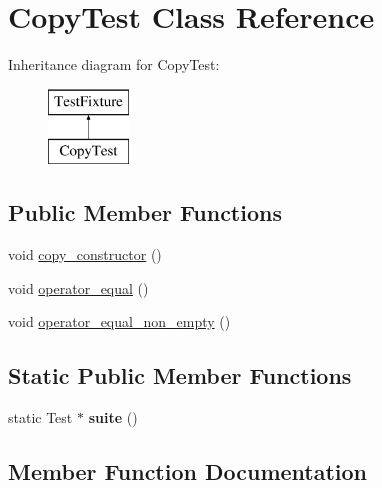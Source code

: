 \hypertarget{class_copy_test}{}\section{Copy\+Test Class Reference}
\label{class_copy_test}
Inheritance diagram for Copy\+Test\+:\begin{figure}[H]
\begin{center}
\leavevmode
\includegraphics[height=2.000000cm]{class_copy_test}
\end{center}
\end{figure}
\subsection*{Public Member Functions}
\begin{DoxyCompactItemize}
\item 
void \hyperlink{class_copy_test_a753620e968ee6ac627e4e65ad139a54f}{copy\+\_\+constructor} ()
\item 
void \hyperlink{class_copy_test_aea0770d1ee3defbee564d72a7d3d9a44}{operator\+\_\+equal} ()
\item 
void \hyperlink{class_copy_test_a37811781b4c94cc5414b236290aae0d0}{operator\+\_\+equal\+\_\+non\+\_\+empty} ()
\end{DoxyCompactItemize}
\subsection*{Static Public Member Functions}
\begin{DoxyCompactItemize}
\item 
\mbox{\label{class_copy_test_a9b9f546e882227c85841847274037bf4}} 
static Test $\ast$ {\bfseries suite} ()
\end{DoxyCompactItemize}


\subsection{Member Function Documentation}
\mbox{\label{class_copy_test_a753620e968ee6ac627e4e65ad139a54f}} 
